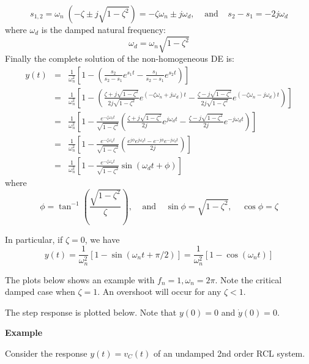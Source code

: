 \[
s_{1,2}=\omega_n \; (-\zeta\pm j\sqrt{1-\zeta^2})=-\zeta \omega_n\pm j\omega_d,
\;\;\;\;\mbox{and}\;\;\;\;s_2-s_1=-2j\omega_d 
\]
where $\omega_d$ is the damped natural frequency:
\[
\omega_d=\omega_n \sqrt{1-\zeta^2} 
\]
Finally the complete solution of the non-homogeneous DE is:
\begin{eqnarray}
  y(t)&=&\frac{1}{\omega_n^2}\left[1-\left(\frac{s_2}{s_2-s_1}e^{s_1t}-\frac{s_1}{s_2-s_1}e^{s_2t}\right)\right]
  \nonumber \\
  &=&\frac{1}{\omega_n^2}\left[ 1-
    \left(\frac{\zeta+j\sqrt{1-\zeta^2}}{2j\sqrt{1-\zeta^2}} e^{(-\zeta\omega_n+j\omega_d)t} 
    -\frac{\zeta-j\sqrt{1-\zeta^2}}{2j\sqrt{1-\zeta^2}} e^{(-\zeta\omega_n-j\omega_d)t} \right) \right]
  \nonumber \\
  &=&\frac{1}{\omega_n^2}\left[ 1-\frac{e^{-\zeta\omega_nt}}{\sqrt{1-\zeta^2}}
    \left(\frac{\zeta+j\sqrt{1-\zeta^2}}{2j} e^{ j\omega_dt} 
    -\frac{\zeta-j\sqrt{1-\zeta^2}}{2j} e^{-j\omega_dt} \right) \right]
  \nonumber \\
  &=&\frac{1}{\omega_n^2}\left[ 1-\frac{e^{-\zeta\omega_nt}}{\sqrt{1-\zeta^2}}
    \left(\frac{ e^{j\phi} e^{ j\omega_dt}-e^{-j\phi} e^{-j\omega_dt} }{2j} \right) \right]
  \nonumber \\
  &=&\frac{1}{\omega_n^2}\left[1-\frac{e^{-\zeta\omega_nt}}{\sqrt{1-\zeta^2}}
    \sin(\omega_dt+\phi) \right]
  \nonumber 
\end{eqnarray}
where 
\[ \phi=\tan^{-1}\left( \frac{\sqrt{1-\zeta^2}}{\zeta} \right),\;\;\;\;\mbox{and}\;\;\;\;
\sin \phi=\sqrt{1-\zeta^2},\;\;\;\;\cos \phi=\zeta  \]


In particular, if $\zeta=0$, we have
\[
y(t)=\frac{1}{\omega_n^2}\left[1-\sin(\omega_n t+\pi/2)\right]
=\frac{1}{\omega_n^2}\left[1-\cos(\omega_n t)\right]
\]

The plots below shows an example with $f_n=1, \omega_n=2\pi$. Note the critical 
damped case when $\zeta=1$. An overshoot will occur for any $\zeta<1$.

The step response is plotted below. Note that $y(0)=0$ and $\dot{y}(0)=0$.




{\bf Example} 

Consider the response $y(t)=v_C(t)$ of an undamped 2nd order RCL system.

